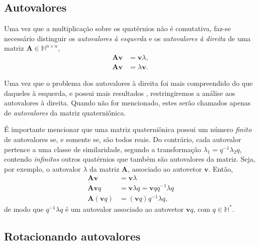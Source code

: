 \subsection{Autovalores}

Uma vez que a multiplica\c c\~ao sobre os quat\'ernios n\~ao \'e comutativa, faz-se necess\'ario distinguir os \emph{autovalores \`a esquerda} e os \emph{autovalores \`a direita} de uma matriz $ \mathbf{A} \in \mathbb{H}^{n \times n} $,
\begin{align*}
\mathbf{A} \mathbf{v} &= \mathbf{v} \lambda, \tag{autovalor \`a direita} \\
\mathbf{A} \mathbf{v} &= \lambda \mathbf{v}.  \tag{autovalor \`a esquerda}
\end{align*}

Uma vez que o problema dos autovalores \`a direita foi mais compreendido do que daqueles \`a esquerda, e possui mais resultados \cite[Cap. 5]{zhang1997quaternions}, restringiremos a an\'alise aos autovalores \`a direita. Quando n\~ao for mencionado, estes ser\~ao chamados apenas de \emph{autovalores} da matriz quaterni\^onica.

\'E importante mencionar que uma matriz quaterni\^onica possui um n\'umero \emph{finito} de autovalores se, e somente se, s\~ao todos reais. Do contr\'ario, cada autovalor pertence a uma classe de similaridade, segundo a transforma\c c\~ao $ \lambda_1 = q^{-1} \lambda_2 q $, contendo \emph{infinitos} outros quat\'ernios que tamb\'em s\~ao autovalores da matriz. Seja, por exemplo, o autovalor $ \lambda $ da matriz $ \mathbf{A} $, associado ao autovetor $ \mathbf{v} $. Ent\~ao,
\begin{equation}
\begin{aligned}
\label{eq:similar}
\mathbf{A} \mathbf{v} &= \mathbf{v} \lambda \\
\mathbf{A} \mathbf{v} q &= \mathbf{v} \lambda q = \mathbf{v} q q^{-1} \lambda q \\
\mathbf{A} (\mathbf{v} q) &= (\mathbf{v} q) q^{-1} \lambda q,
\end{aligned}
\end{equation}
de modo que $ q^{-1} \lambda q $ \'e um autovalor associado ao autovetor $ \mathbf{v}q $, com $ q \in \mathbb{H}^\ast $.

\subsection{Rotacionando autovalores}
\label{subsec:rotacionando}


